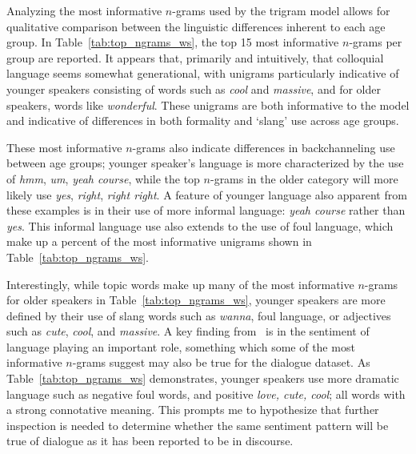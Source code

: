 Analyzing the most informative $n$-grams 
used by the trigram model
allows for qualitative comparison between the linguistic differences inherent to each age group. In Table~\ref{tab:top_ngrams_ws}, the top 15 most informative $n$-grams per group are reported.
It appears that, primarily and intuitively, that colloquial language seems somewhat generational, with unigrams particularly indicative of younger speakers consisting of words such as 
\emph{cool} and \emph{massive}, and
for older speakers, words like
\emph{wonderful}.
These unigrams are both informative to the model and indicative of differences in both formality and `slang' use across age groups.

These most informative $n$-grams also indicate differences in backchanneling use between age groups; younger speaker's language is more characterized by the use of \emph{hmm}, \emph{um}, \emph{yeah course}, while the top $n$-grams in the older category will more likely use
\emph{yes}, \emph{right}, \emph{right right}.
A feature of younger language also apparent from these examples is in their use of more informal language: \emph{yeah course} rather than \emph{yes}.
This informal language use also extends to the use of foul language, which make up a percent of the most informative unigrams shown in Table~\ref{tab:top_ngrams_ws}. %

Interestingly, while topic words make up many of the most informative $n$-grams for older speakers in Table~\ref{tab:top_ngrams_ws}, younger speakers are more defined by their use of slang words such as \textit{wanna}, foul language, or adjectives such as \textit{cute}, \emph{cool}, and \emph{massive}.
A key finding from~\citet{schler2006effects} is in the sentiment of language playing an important role, something which some of the most informative $n$-grams suggest may also be true for the dialogue dataset. As Table~\ref{tab:top_ngrams_ws} demonstrates, younger speakers use more dramatic language %
such as negative foul words, and positive \textit{love, cute, cool}; all words with a strong connotative meaning. 
This prompts me to hypothesize that further inspection is needed to determine whether the same sentiment pattern will be true of dialogue as it has been reported to be in discourse.


